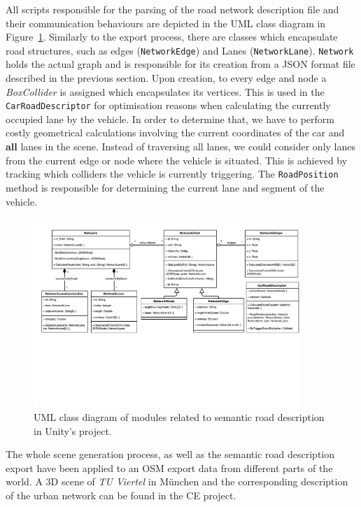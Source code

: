 All scripts responsible for the parsing of the road network description file and their communication behaviours are depicted in the UML class diagram in Figure~\ref{fig:unity-uml-1}. Similarly to the export process, there are classes which encapsulate road structures, such as edges (\texttt{NetworkEdge}) and Lanes (\texttt{NetworkLane}). \texttt{Network} holds the actual graph and is responsible for its creation from a JSON format file described in the previous section. Upon creation, to every edge and node a \emph{BoxCollider} is assigned which encapsulates its vertices. This is used in the \texttt{CarRoadDescriptor} for optimisation reasons when calculating the currently occupied lane by the vehicle. In order to determine that, we have to perform costly geometrical calculations involving the current coordinates of the car and \textbf{all} lanes in the scene. Instead of traversing all lanes, we could consider only lanes from the current edge or node where the vehicle is situated. This is achieved by tracking which colliders the vehicle is currently triggering. The \texttt{RoadPosition} method is responsible for determining the current lane and segment of the vehicle.

\begin{figure}[htb]
	\centering
	\includegraphics[width=0.9\textwidth]{figures/unity-uml}
	\caption{UML class diagram of modules related to semantic road description in Unity's project.}
	\label{fig:unity-uml-1}
\end{figure}

The whole scene generation process, as well as the semantic road description export have been applied to an OSM export data from different parts of the world. A 3D scene of \emph{TU Viertel} in M\"unchen and the corresponding description of the urban network can be found in the CE project. 



